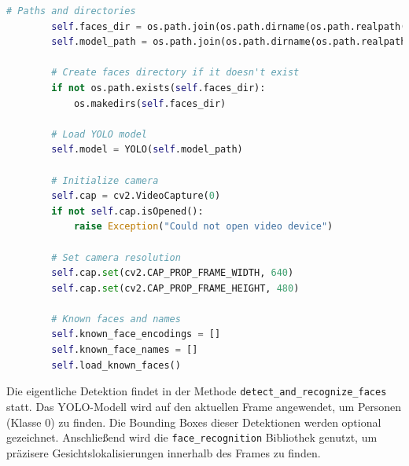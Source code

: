 \begin{lstlisting}[language=Python, caption={Initialisierung des YOLO-Modells und der Kamera}, label={lst:yolo_init}, inputencoding=utf8]
        # Paths and directories
        self.faces_dir = os.path.join(os.path.dirname(os.path.realpath(__file__)), "..", "..", "img")
        self.model_path = os.path.join(os.path.dirname(os.path.realpath(__file__)), "..", "..", "models", "yolov8n-face.pt")

        # Create faces directory if it doesn't exist
        if not os.path.exists(self.faces_dir):
            os.makedirs(self.faces_dir)

        # Load YOLO model
        self.model = YOLO(self.model_path)

        # Initialize camera
        self.cap = cv2.VideoCapture(0)
        if not self.cap.isOpened():
            raise Exception("Could not open video device")

        # Set camera resolution
        self.cap.set(cv2.CAP_PROP_FRAME_WIDTH, 640)
        self.cap.set(cv2.CAP_PROP_FRAME_HEIGHT, 480)

        # Known faces and names
        self.known_face_encodings = []
        self.known_face_names = []
        self.load_known_faces()
\end{lstlisting}

Die eigentliche Detektion findet in der Methode \texttt{detect\_and\_recognize\_faces} statt. Das YOLO-Modell wird auf den aktuellen Frame angewendet, um Personen (Klasse 0) zu finden. Die Bounding Boxes dieser Detektionen werden optional gezeichnet. Anschließend wird die \texttt{face\_recognition} Bibliothek genutzt, um präzisere Gesichtslokalisierungen innerhalb des Frames zu finden.

